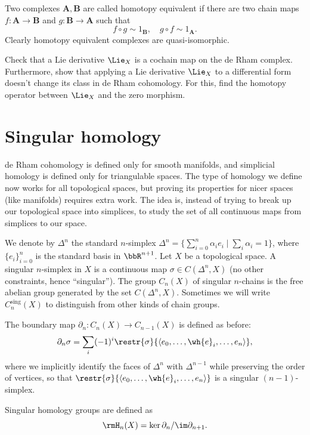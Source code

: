 \begin{defn}
    Two complexes $\bm{A},\bm{B}$ are called homotopy equivalent if there are two chain maps $f:\bm{A}\to \bm{B}$ and $g:\bm{B}\to\bm{A}$ such that
    \[f\circ g\sim 1_{\bm{B}},\quad g\circ f\sim 1_{\bm{A}}.\]
    Clearly homotopy equivalent complexes are quasi-isomorphic.
\end{defn}


\begin{xca}\label{Lie derivative homotopy operator}
    Check that a Lie derivative $\Lie_X$ is a cochain map on the de Rham complex. Furthermore, show that applying a Lie derivative $\Lie_X$ to a differential form doesn't change its class in de Rham cohomology. For this, find the homotopy operator between $\Lie_X$ and the zero morphism.
\end{xca}







\section{Singular homology}

de Rham cohomology is defined only for smooth manifolds, and simplicial homology is defined only for triangulable spaces. The type of homology we define now works for all topological spaces, but proving its properties for nicer spaces (like manifolds) requires extra work. The idea is, instead of trying to break up our topological space into simplices, to study the set of all continuous maps from simplices to our space.

\begin{defn}
    We denote by $\Delta^n$ the standard $n$-simplex $\Delta^n=\{\sum_{i=0}^{n} \alpha_i e_i\mid \sum_i\alpha_i=1\}$, where $\{e_i\}_{i=0}^{n}$ is the standard basis in $\bbR^{n+1}$. Let $X$ be a topological space. A singular $n$-simplex in $X$ is a continuous map $\sigma\in C(\Delta^n, X)$ (no other constraints, hence ``singular''). The group $C_n(X)$ of singular $n$-chains is the free abelian group generated by the set $C(\Delta^n,X)$. Sometimes we will write $C^{\text{sing}}_n(X)$ to distinguish from other kinds of chain groups.
\end{defn}
\begin{defn}
    The boundary map $\partial_n:C_n(X)\to C_{n-1}(X)$ is defined as before:
    \[\partial_n\sigma=\sum_i (-1)^i\restr{\sigma}{\langle e_0,\ldots,\wh{e}_i,\ldots,e_n\rangle},\]
    where we implicitly identify the faces of $\Delta^n$ with $\Delta^{n-1}$ while preserving the order of vertices, so that $\restr{\sigma}{\langle e_0,\ldots,\wh{e}_i,\ldots,e_n\rangle}$ is a singular $(n-1)$-simplex.
    
    Singular homology groups are defined as
    \[\rmH_n(X)=\ker\partial_n/\im\partial_{n+1}.\]
\end{defn}

